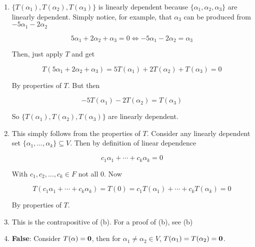 \documentclass[12pt]{article}
\renewcommand{\vec}[1]{
  {\bf #1}
}
\begin{document}
  {
    \begin{enumerate}[label=(\alph*)]
      \item $\{T(\alpha_1), T(\alpha_2), T(\alpha_3)\}$ is linearly dependent
        because $\{\alpha_1, \alpha_2, \alpha_3\}$ are linearly dependent.
        Simply notice, for example, that $\alpha_3$ can be produced from
        $-5\alpha_1 - 2\alpha_2$

        \[
          5\alpha_1 + 2\alpha_2 + \alpha_3 = 0 \Leftrightarrow -5\alpha_1 - 2\alpha_2 = \alpha_3
        \]

        Then, just apply $T$ and get

        \[
          T(5\alpha_1 + 2\alpha_2 + \alpha_3) = 5T(\alpha_1) + 2T(\alpha_2) +
          T(\alpha_3) = 0
        \]

        By properties of $T$. But then

        \[
          -5T(\alpha_1) - 2T(\alpha_2) = T(\alpha_3)
        \]

        So $\{T(\alpha_1), T(\alpha_2), T(\alpha_3)\}$ are linearly dependent.

      \item This simply follows from the properties of $T$. Consider any
        linearly dependent set $\{\alpha_1, \dots, \alpha_k\} \subseteq V$.
        Then by definition of linear dependence

        \[
          c_1 \alpha_1 + \cdots + c_k \alpha_k = 0
        \]

        With $c_1, c_2, \dots, c_k \in F$ not all $0$. Now

        \[
          T(c_1 \alpha_1 + \cdots + c_k \alpha_k) = T(0) = c_1T(\alpha_1) + \cdots +
          c_k T(\alpha_k) = 0
        \]

        By properties of $T$.

      \item This is the contrapositive of (b). For a proof of (b), see (b)

      \item {\bf False}: Consider $T(\alpha) = \vec{0}$, then for $\alpha_1 \ne
        \alpha_2 \in V$, $T(\alpha_1) = T(\alpha_2) = \vec{0}$.

    \end{enumerate}
  }
\end{document}
